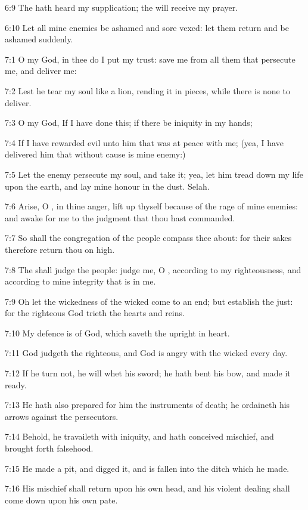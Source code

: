 6:9 The \LORD hath heard my supplication; the \LORD will receive my
prayer.

6:10 Let all mine enemies be ashamed and sore vexed: let them return
and be ashamed suddenly.



7:1 O \LORD my God, in thee do I put my trust: save me from all them
that persecute me, and deliver me:

7:2 Lest he tear my soul like a lion, rending it in pieces, while
there is none to deliver.

7:3 O \LORD my God, If I have done this; if there be iniquity in my
hands;

7:4 If I have rewarded evil unto him that was at peace with me; (yea,
I have delivered him that without cause is mine enemy:)

7:5 Let the enemy persecute my soul, and take it; yea, let him tread
down my life upon the earth, and lay mine honour in the dust. Selah.

7:6 Arise, O \LORD, in thine anger, lift up thyself because of the rage
of mine enemies: and awake for me to the judgment that thou hast
commanded.

7:7 So shall the congregation of the people compass thee about: for
their sakes therefore return thou on high.

7:8 The \LORD shall judge the people: judge me, O \LORD, according to my
righteousness, and according to mine integrity that is in me.

7:9 Oh let the wickedness of the wicked come to an end; but establish
the just: for the righteous God trieth the hearts and reins.

7:10 My defence is of God, which saveth the upright in heart.

7:11 God judgeth the righteous, and God is angry with the wicked every
day.

7:12 If he turn not, he will whet his sword; he hath bent his bow, and
made it ready.

7:13 He hath also prepared for him the instruments of death; he
ordaineth his arrows against the persecutors.

7:14 Behold, he travaileth with iniquity, and hath conceived mischief,
and brought forth falsehood.

7:15 He made a pit, and digged it, and is fallen into the ditch which
he made.

7:16 His mischief shall return upon his own head, and his violent
dealing shall come down upon his own pate.

